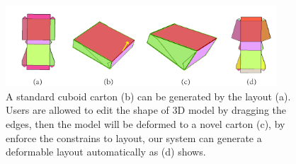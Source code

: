 \begin{figure}
	\centering
	\includegraphics[width=0.9\textwidth]{images/editing.jpg}
	\caption{A standard cuboid carton (b) can be generated by the layout (a). Users are allowed to edit the shape of 3D model by dragging the edges, then the model will be deformed to a novel carton (c), by enforce the constrains to layout, our system can generate a deformable layout automatically as (d) shows.}
	\label{fig:editing}
\end{figure}
